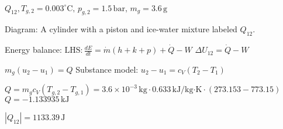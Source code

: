 \( Q_{12}, T_{g,2} = 0.003^\circ \text{C}, \, p_{g,2} = 1.5 \, \text{bar}, \, m_g = 3.6 \, \text{g} \)  

Diagram: A cylinder with a piston and ice-water mixture labeled \( Q_{12} \).  

Energy balance:  
\( \text{LHS:} \, \frac{dE}{dt} = \dot{m}(h + k + p) + \dot{Q} - W \)  
\( \Delta U_{12} = \dot{Q} - W \)  

\( m_g(u_2 - u_1) = Q \)  
Substance model: \( u_2 - u_1 = c_V(T_2 - T_1) \)  

\( Q = m_g c_V (T_{g,2} - T_{g,1}) = 3.6 \times 10^{-3} \, \text{kg} \cdot 0.633 \, \text{kJ/kg·K} \cdot (273.153 - 773.15) \)  
\( Q = -1.133935 \, \text{kJ} \)  

\( |Q_{12}| = 1133.39 \, \text{J} \)